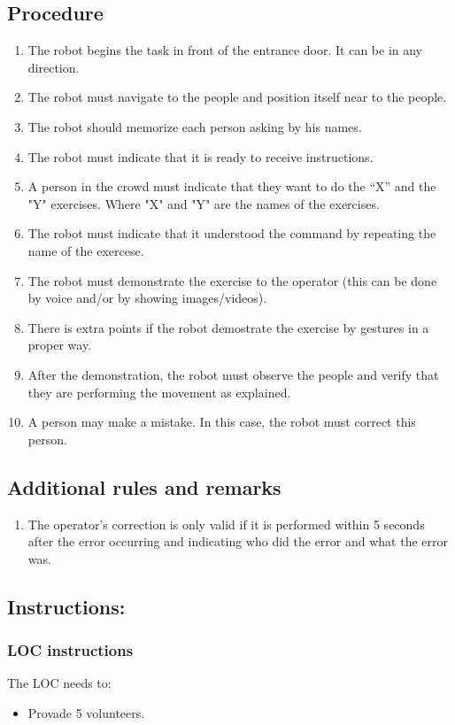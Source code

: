 \subsection*{Procedure}
\begin{enumerate}[nosep]
	\item The robot begins the task in front of the entrance door. It can be in any direction.
	\item The robot must navigate to the people and position itself near to the people.
	\item The robot should memorize each person asking by his names.
 	\item The robot must indicate that it is ready to receive instructions.
	\item A person in the crowd must indicate that they want to do the “X” and the "Y" exercises. Where "X" and "Y" are the names of the exercises.
	\item The robot must indicate that it understood the command by repeating the name of the exercese.
	\item The robot must demonstrate the exercise to the operator (this can be done by voice and/or by showing images/videos).
	\item There is extra points if the robot demostrate the exercise by gestures in a proper way. 
 	\item After the demonstration, the robot must observe the people and verify that they are performing the movement as explained.
	\item A person may make a mistake. In this case, the robot must correct this person. 
\end{enumerate}

\subsection*{Additional rules and remarks}
\begin{enumerate}[nosep]
	\item The operator's correction is only valid if it is performed within 5 seconds after the error occurring and indicating who did the error and what the error was.
\end{enumerate}

\subsection*{Instructions:}

\subsubsection*{LOC instructions}
The LOC needs to:
\begin{itemize}[nosep]
	\item Provade 5 volunteers.
\end{itemize}

